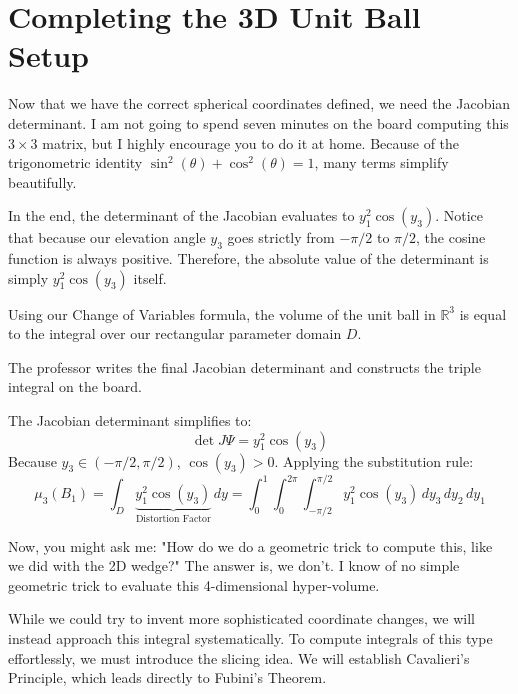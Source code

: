 \setcounter{section}{4} %

\section{Completing the 3D Unit Ball Setup}

\begin{spoken-clean}[00:32:53 - 00:36:10]
Now that we have the correct spherical coordinates defined, we need the Jacobian determinant. I am not going to spend seven minutes on the board computing this $3 \times 3$ matrix, but I highly encourage you to do it at home. Because of the trigonometric identity $\sin^2(\theta) + \cos^2(\theta) = 1$, many terms simplify beautifully.

In the end, the determinant of the Jacobian evaluates to $y_1^2 \cos(y_3)$. Notice that because our elevation angle $y_3$ goes strictly from $-\pi/2$ to $\pi/2$, the cosine function is always positive. Therefore, the absolute value of the determinant is simply $y_1^2 \cos(y_3)$ itself.

Using our Change of Variables formula, the volume of the unit ball in $\mathbb{R}^3$ is equal to the integral over our rectangular parameter domain $D$.
\end{spoken-clean}

\begin{nice-box}
The professor writes the final Jacobian determinant and constructs the triple integral on the board.
\end{nice-box}

\begin{math-stroke}
The Jacobian determinant simplifies to:
\[
\det J\Psi = y_1^2 \cos(y_3)
\]
Because $y_3 \in (-\pi/2, \pi/2)$, $\cos(y_3) > 0$. Applying the substitution rule:
\begin{equation} \label{eq:ball_3d_integral}
\mu_3(B_1) = \int_{D} \underbrace{y_1^2 \cos(y_3)}_{\text{Distortion Factor}} \, dy = \int_0^1 \int_0^{2\pi} \int_{-\pi/2}^{\pi/2} y_1^2 \cos(y_3) \, dy_3 \, dy_2 \, dy_1
\end{equation}
\end{math-stroke}

\begin{spoken-clean}[00:36:10 - 00:40:07]
Now, you might ask me: "How do we do a geometric trick to compute this, like we did with the 2D wedge?" The answer is, we don't. I know of no simple geometric trick to evaluate this 4-dimensional hyper-volume. 

While we could try to invent more sophisticated coordinate changes, we will instead approach this integral systematically. To compute integrals of this type effortlessly, we must introduce the slicing idea. We will establish Cavalieri's Principle, which leads directly to Fubini's Theorem.
\end{spoken-clean}

